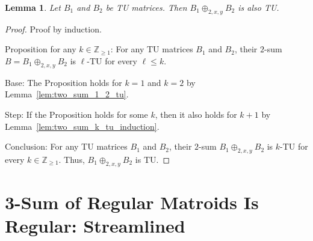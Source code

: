 \documentclass{article}
\newtheorem{lemma}{Lemma}
\theoremstyle{definition}
\begin{document}
\begin{lemma}\label{lem:two_sum_tu}
    Let $B_{1}$ and $B_{2}$ be TU matrices. Then $B_{1} \oplus_{2, x, y} B_{2}$ is also TU.
\end{lemma}

\begin{proof}
    Proof by induction.

    Proposition for any $k \in \mathbb{Z}_{\geq 1}$: For any TU matrices $B_{1}$ and $B_{2}$, their $2$-sum $B = B_{1} \oplus_{2, x, y} B_{2}$ is $\ell$-TU for every $\ell \leq k$.

    Base: The Proposition holds for $k = 1$ and $k = 2$ by Lemma~\ref{lem:two_sum_1_2_tu}.

    Step: If the Proposition holds for some $k$, then it also holds for $k + 1$ by Lemma~\ref{lem:two_sum_k_tu_induction}.

    Conclusion: For any TU matrices $B_{1}$ and $B_{2}$, their $2$-sum $B_{1} \oplus_{2, x, y} B_{2}$ is $k$-TU for every $k \in \mathbb{Z}_{\geq 1}$. Thus, $B_{1} \oplus_{2, x, y} B_{2}$ is TU.
\end{proof}


\section{3-Sum of Regular Matroids Is Regular: Streamlined}
\end{document}
